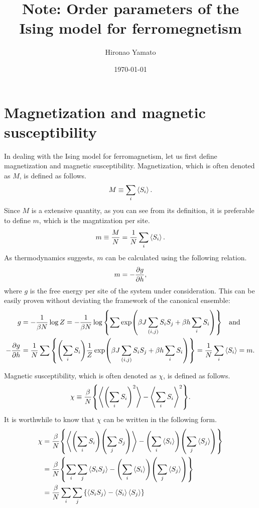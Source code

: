 \documentclass[aps, 12pt]{revtex4-2}
\begin{document}
\title{Note: Order parameters of the Ising model for ferromegnetism}
\author{Hironao Yamato}
\date{\today}
\maketitle

\section{Magnetization and magnetic susceptibility}
In dealing with the Ising model for ferromagnetism, let us first define magnetization and magnetic susceptibility. Magnetization, which is often denoted as $M$, is defined as follows.
\begin{align}
  M \equiv \sum_{i} \ev{S_i}.
\end{align}
Since $M$ is a extensive quantity, as you can see from its definition, it is preferable to define $m$, which is the magntization per site.
\begin{align}
  m \equiv \frac{M}{N} = \frac{1}{N} \sum_i \ev{S_i}.
\end{align}
As thermodynamics suggests, $m$ can be calculated using the following relation.
\begin{align}
  m = -\pdv{g}{h},
\end{align}
where $g$ is the free energy per site of the system under consideration. This can be easily proven without deviating the framework of the canonical ensemble:
\begin{align}
  g            &= -\frac{1}{\beta N} \log Z = -\frac{1}{\beta N} \log \qty{ \sum \exp(\beta J \sum_{(i, j)}S_iS_j + \beta h \sum_i S_i)} \quad \text{and} \\
  - \pdv{g}{h} &= \frac{1}{N} \sum \qty{\qty(\sum_i S_i)\frac{1}{Z}\exp(\beta J \sum_{(i, j)}S_iS_j + \beta h \sum_i S_i)} = \frac{1}{N} \sum_i \ev{S_i} = m.
\end{align}

Magnetic susceptibility, which is often denoted as $\chi$, is defined as follows.
\begin{align}
  \chi \equiv \frac{\beta}{N}\qty{\ev{\qty(\sum_iS_i)^2} - \ev{\sum_iS_i}^2}.
\end{align}
It is worthwhile to know that $\chi$ can be written in the following form.
\begin{align}
  \chi &= \frac{\beta}{N}\qty{\ev{\qty(\sum_i S_i)\qty(\sum_j S_j)} - \qty(\sum_i\ev{S_i})\qty(\sum_j\ev{S_j})} \\
       &= \frac{\beta}{N}\qty{\sum_i\sum_j \ev{S_iS_j} - \qty(\sum_i\ev{S_i})\qty(\sum_j\ev{S_j})}              \\
       &= \frac{\beta}{N}\sum_i\sum_j \qty{\ev{S_iS_j} - \ev{S_i}\ev{S_j}}
\end{align}

\end{document}
